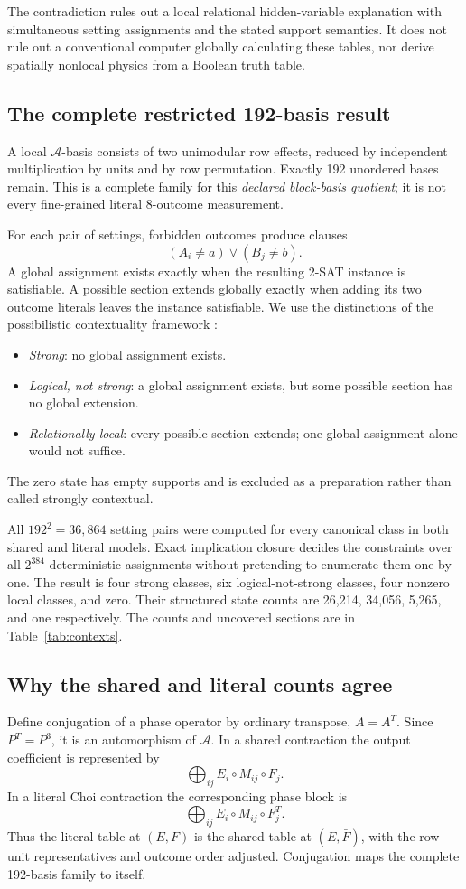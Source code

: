 \documentclass[11pt,a4paper]{article}
\theoremstyle{definition}\newtheorem{definition}[theorem]{Definition}
\newcommand{\A}{\mathcal A}
\begin{document}
The contradiction rules out a local relational hidden-variable explanation with simultaneous setting assignments and the stated support semantics. It does not rule out a conventional computer globally calculating these tables, nor derive spatially nonlocal physics from a Boolean truth table.

\subsection{The complete restricted 192-basis result}
A local $\A$-basis consists of two unimodular row effects, reduced by independent multiplication by units and by row permutation. Exactly 192 unordered bases remain. This is a complete family for this \emph{declared block-basis quotient}; it is not every fine-grained literal $8$-outcome measurement.

For each pair of settings, forbidden outcomes produce clauses
\[
 (A_i\ne a)\lor(B_j\ne b).
\]
A global assignment exists exactly when the resulting 2-SAT instance is satisfiable. A possible section extends globally exactly when adding its two outcome literals leaves the instance satisfiable. We use the distinctions of the possibilistic contextuality framework \cite{abramsky2011}:
\begin{itemize}
\item \emph{Strong}: no global assignment exists.
\item \emph{Logical, not strong}: a global assignment exists, but some possible section has no global extension.
\item \emph{Relationally local}: every possible section extends; one global assignment alone would not suffice.
\end{itemize}
The zero state has empty supports and is excluded as a preparation rather than called strongly contextual.

All $192^2=36,864$ setting pairs were computed for every canonical class in both shared and literal models. Exact implication closure decides the constraints over all $2^{384}$ deterministic assignments without pretending to enumerate them one by one. The result is four strong classes, six logical-not-strong classes, four nonzero local classes, and zero. Their structured state counts are 26,214, 34,056, 5,265, and one respectively. The counts and uncovered sections are in Table~\ref{tab:contexts}.

\subsection{Why the shared and literal counts agree}
Define conjugation of a phase operator by ordinary transpose, $\bar A=A^T$. Since $P^T=P^3$, it is an automorphism of $\A$. In a shared contraction the output coefficient is represented by
\[
 \bigoplus_{ij} E_i\circ M_{ij}\circ F_j.
\]
In a literal Choi contraction the corresponding phase block is
\[
 \bigoplus_{ij} E_i\circ M_{ij}\circ F_j^T.
\]
Thus the literal table at $(E,F)$ is the shared table at $(E,\bar F)$, with the row-unit representatives and outcome order adjusted. Conjugation maps the complete 192-basis family to itself.
\end{document}
